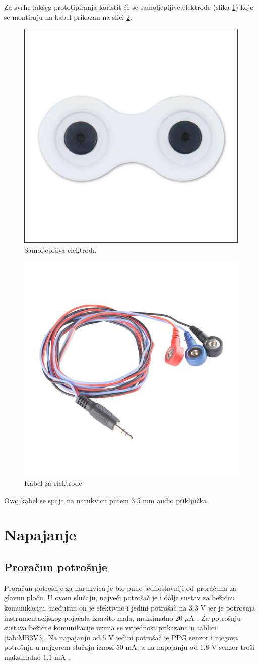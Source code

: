 Za svrhe lakšeg prototipiranja koristit će se samoljepljive elektrode (slika \ref{slk:ELECTRODE}) koje se montiraju na kabel prikazan na slici \ref{slk:CABLE}. 
\begin{figure}[htb]
    \centering
    \includegraphics[width=6 cm]{Figures/ELECTRODE-BOTTOM.jpg}
    \caption{Samoljepljiva elektroda}
    \label{slk:ELECTRODE}
\end{figure}
\begin{figure}
    \centering
    \includegraphics[width=6 cm]{Figures/CABLE.jpg}
    \caption{Kabel za elektrode}
    \label{slk:CABLE}
\end{figure}
Ovaj kabel se spaja na narukvicu putem 3.5 mm audio priključka.

\section{Napajanje}
\subsection{Proračun potrošnje}

Proračun potrošnje za narukvicu je bio puno jednostavniji od proračuna za glavnu ploču. U ovom slučaju, najveći potrošač je i dalje sustav za bežičnu komunikaciju, međutim on je efektivno i jedini potrošač na 3.3 V jer je potrošnja instrumentacijskog pojačala izrazito mala, maksimalno 20 $\mu\textrm{A}$ \cite{ad:ad8226}. Za potrošnju sustava bežične komunikacije uzima se vrijednost prikazana u tablici \ref{tab:MB3V3}. Na napajanju od 5 V jedini potrošač je PPG senzor i njegova potrošnja u najgorem slučaju iznosi 50 mA, a na napajanju od 1.8 V senzor troši maksimalno 1.1 mA \cite{ad:max30101}.

